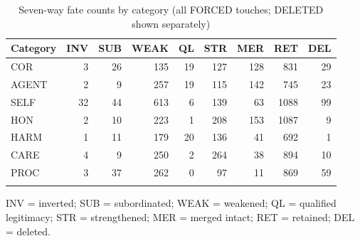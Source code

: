 \begin{table}[t]
\centering
\caption{Seven-way fate counts by category (all FORCED touches; DELETED shown separately)}
\label{tab:fates}
\begin{tabular}{lrrrrrrrr}
\toprule
Category & INV\tnote{a} & SUB & WEAK & QL & STR & MER & RET & DEL \\
\midrule
COR & 3 & 26 & 135 & 19 & 127 & 128 & 831 & 29 \\
AGENT & 2 & 9 & 257 & 19 & 115 & 142 & 745 & 23 \\
SELF & 32 & 44 & 613 & 6 & 139 & 63 & 1088 & 99 \\
HON & 2 & 10 & 223 & 1 & 208 & 153 & 1087 & 9 \\
HARM & 1 & 11 & 179 & 20 & 136 & 41 & 692 & 1 \\
CARE & 4 & 9 & 250 & 2 & 264 & 38 & 894 & 10 \\
PROC & 3 & 37 & 262 & 0 & 97 & 11 & 869 & 59 \\
\botrule
\end{tabular}
\begin{tablenotes}
\item[a] INV = inverted; SUB = subordinated; WEAK = weakened; QL = qualified legitimacy; STR = strengthened; MER = merged intact; RET = retained; DEL = deleted.
\end{tablenotes}
\end{table}
